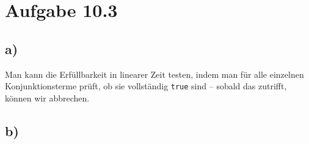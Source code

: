 \documentclass{article}
\begin{document}
\section*{Aufgabe 10.3}
\subsection*{a)}
Man kann die Erfüllbarkeit in linearer Zeit testen, indem man für alle einzelnen Konjunktionsterme prüft, ob sie vollständig \texttt{true} sind -- sobald das zutrifft, können wir abbrechen.

\subsection*{b)}
\end{document}
